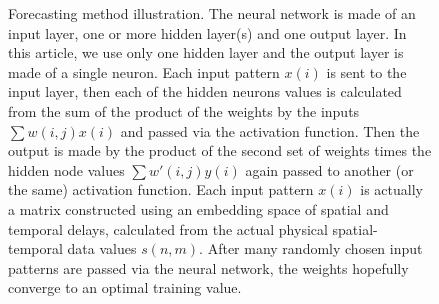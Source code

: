 \documentclass[journal]{IEEEtran}
\begin{document}
\begin{figure}
\caption{Forecasting method illustration. The neural network is made of an input layer, one or more hidden layer(s) and one output layer.
In this article, we use only one hidden layer and the output layer is made of a single neuron. Each input pattern $x(i)$ is sent to the
input layer, then each of the hidden neurons values is calculated from the sum of the product of the weights by the inputs $\sum w(i,j) x(i)$
and passed via the activation function. Then the output is made by the product of the second set of
weights times the hidden node values $\sum w'(i,j) y(i)$ again passed to another (or the same) activation function.
Each input pattern $x(i)$ is actually a matrix constructed using an embedding space of
spatial and temporal delays, calculated from the actual physical spatial-temporal data values $s(n,m)$. After many randomly chosen input patterns
are passed via the neural network, the weights hopefully converge to an optimal training value.}
\label{architecture}
\end{figure}
\end{document}
